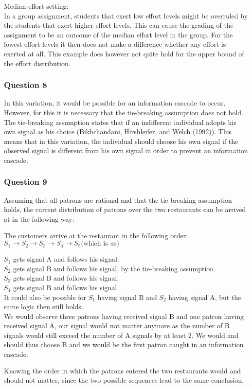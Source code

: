 \documentclass[a4paper]{article}
\begin{document}
\begin{enumerate}[(a)]
Median effort setting:\\
In a group assignment, students that exert low effort levels might be overruled by the students that exert higher effort levels. This can cause the grading of the assignment to be an outcome of the median effort level in the group. For the lowest effort levels it then does not make a difference whether any effort is exerted at all. This example does however not quite hold for the upper bound of the effort distribution.
\end{enumerate}
\subsubsection{Question 8}

In this variation, it would be possible for an information cascade to occur. However, for this it is necessary that the tie-breaking assumption does not hold. The tie-breaking assumption states that if an indifferent individual adopts his own signal as his choice (Bikhchandani, Hirshleifer, and Welch (1992)). This means that in this variation, the individual should choose his own signal if the observed signal is different from his own signal in order to prevent an information cascade.

\subsubsection{Question 9}

Assuming that all patrons are rational and that the tie-breaking assumption holds, the current distribution of patrons over the two restaurants can be arrived at in the following way:

The customers arrive at the restaurant in the following order:\\ $S_1\rightarrow S_2 \rightarrow S_3 \rightarrow S_4 \rightarrow S_5 \text{(which is us)}$

$S_1$ gets signal A and follows his signal.\\
$S_2$ gets signal B and follows his signal, by the tie-breaking assumption.\\
$S_3$ gets signal B and follows his signal.\\
$S_4$ gets signal B and follows his signal.\\

It could also be possible for $S_1$ having signal B and $S_2$ having signal A, but the same logic then still holds.\\

We would observe three patrons having received signal B and one patron having received signal A, our signal would not matter anymore as the number of B signals would still exceed the number of A signals by at least 2. We would and should thus choose B and we would be the first patron caught in an information cascade. 

Knowing the order in which the patrons entered the two restaurants would and should not matter, since the two possible sequences lead to the same conclusion.
\end{document}
